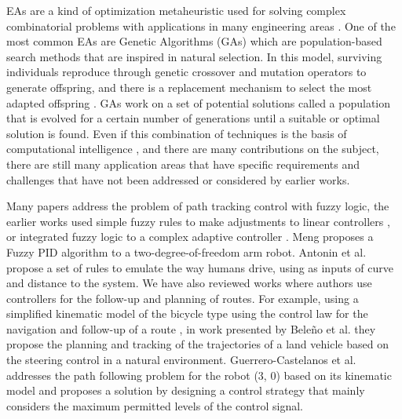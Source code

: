 \documentclass[symmetry,article,submit,moreauthors,pdftex]{Definitions/mdpi}
\begin{document}
EAs are a kind of optimization metaheuristic used for solving complex
combinatorial problems \cite{back1993overview} with applications in many
engineering areas \cite{mateos_algoritmos_2004}.  One of the most common EAs
are Genetic Algorithms (GAs) \cite{holland1992genetic} which are
population-based search methods that are inspired in natural selection. In this
model, surviving individuals reproduce through genetic crossover and mutation
operators to generate offspring, and there is a replacement mechanism to select
the most adapted offspring \cite{muelas_algoritmos_2009}. GAs work on a set of
potential solutions called a population that is evolved for a certain number of
generations until a suitable or optimal solution is found. Even if this
combination of techniques is the basis of computational intelligence
\cite{wan1970applying,engelbrecht2007computational}, and there are many
contributions on the subject, there are still many application areas that have
specific requirements and challenges that have not been addressed or considered
by earlier works.

Many papers address the problem of path tracking control with fuzzy logic, the
earlier works used simple fuzzy rules to make adjustments to linear controllers
\cite{lee_practical_2003}, or integrated fuzzy logic to a complex adaptive
controller \cite{sanchez1997adaptive}. Meng \cite{bi_control_2020} proposes a
Fuzzy PID %
algorithm to a two-degree-of-freedom arm robot. Antonin et al.
\cite{antonelli_fuzzy-logic-based_2007} propose a set of rules to emulate the
way humans drive, using as inputs of curve and distance to the system.  We have
also reviewed works where authors use controllers for the follow-up and
planning of routes. For example, using a simplified kinematic model of the
bicycle type using the control law for the navigation and follow-up of a route
\cite{laumond_robot_1998}, in work presented by Beleño et al.
\cite{beleno_planeacion_2014} they propose the planning and tracking of the
trajectories of a land vehicle based on the steering control in a natural
environment.  Guerrero-Castelanos et al.
\cite{guerrero-castellanos_trajectory_2014} addresses the path following
problem for the robot (3, 0) based on its kinematic model and proposes a
solution by designing a control strategy that mainly considers the maximum
permitted levels of the control signal. 
\end{document}
